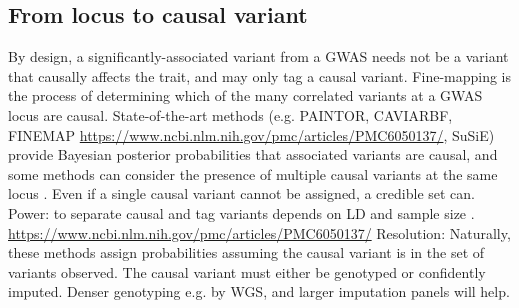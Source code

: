 \begin{outline}
%

\subsection{From locus to causal variant}

\1 By design, a significantly-associated variant from a \gls{GWAS} needs not be a variant that causally affects the trait, and may only tag a causal variant.
    \2 Fine-mapping is the process of determining which of the many correlated variants at a \gls{GWAS} locus are causal.
    \2 State-of-the-art methods (e.g. PAINTOR, CAVIARBF, FINEMAP \url{https://www.ncbi.nlm.nih.gov/pmc/articles/PMC6050137/}, SuSiE) provide Bayesian posterior probabilities that associated variants are causal, and some methods can consider the presence of multiple causal variants at the same locus \autocite{schaid2018GenomewideAssociationsCandidate}.
    \2 Even if a single causal variant cannot be assigned, a credible set can.
    \2 Power: to separate causal and tag variants depends on \gls{LD} and sample size \autocite{visscher201710YearsGWAS}. \url{https://www.ncbi.nlm.nih.gov/pmc/articles/PMC6050137/}
    \2 Resolution: Naturally, these methods assign probabilities assuming the causal variant is in the set of variants observed.
    \2 The causal variant must either be genotyped or confidently imputed. Denser genotyping e.g. by WGS, and larger imputation panels will help.


\end{outline}
